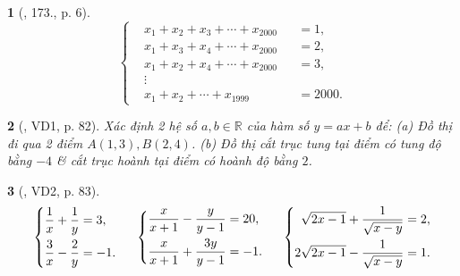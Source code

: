 \documentclass{article}
\newtheorem{baitoan}{}
\begin{document}
\begin{baitoan}[\cite{Dong_23_1001_toan_I}, 173., p. 6]
	\begin{equation*}
		\left\{\begin{split}
			&x_1 + x_2 + x_3 + \cdots + x_{2000} &&= 1,\\
			&x_1 + x_3 + x_4 + \cdots + x_{2000} &&= 2,\\
			&x_1 + x_2 + x_4 + \cdots + x_{2000} &&= 3,\\
			&\vdots\\
			&x_1 + x_2 + \cdots + x_{1999} &&= 2000.
		\end{split}\right.
	\end{equation*}
\end{baitoan}

\begin{baitoan}[\cite{Kien_dai_so_9}, VD1, p. 82]
	Xác định 2 hệ số $a,b\in\mathbb{R}$ của hàm số $y = ax + b$ để: (a) Đồ thị đi qua 2 điểm $A(1,3),B(2,4)$. (b) Đồ thị cắt trục tung tại điểm có tung độ bằng $-4$ \& cắt trục hoành tại điểm có hoành độ bằng $2$.
\end{baitoan}

\begin{baitoan}[\cite{Kien_dai_so_9}, VD2, p. 83]
	\begin{equation*}
		\left\{\begin{split}
			\frac{1}{x} + \frac{1}{y} &= 3,\\
			\frac{3}{x} - \frac{2}{y} &= -1.
		\end{split}\right.\hspace{5mm}\left\{\begin{split}
			\frac{x}{x + 1} - \frac{y}{y - 1} &= 20,\\
			\frac{x}{x + 1} + \frac{3y}{y - 1} &= -1.
		\end{split}\right.\hspace{5mm}\left\{\begin{split}
			\sqrt{2x - 1} + \frac{1}{\sqrt{x - y}} &= 2,\\
			2\sqrt{2x - 1} - \frac{1}{\sqrt{x - y}} &= 1.
		\end{split}\right.
	\end{equation*}
\end{baitoan}
\end{document}
